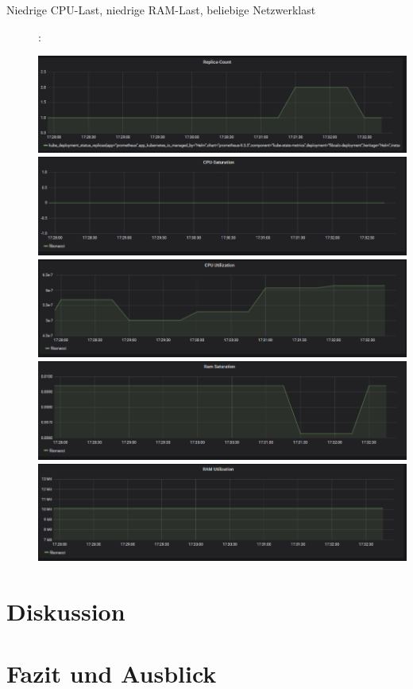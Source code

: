 \documentclass[a4paper,10pt]{scrartcl}
\begin{document}
\begin{description}

\item[Niedrige CPU-Last, niedrige RAM-Last, beliebige Netzwerklast]:\\

\begin{minipage}{\linewidth}
            \includegraphics[width=.5\textwidth]{img/Herunterskalieren/Replica-Count.PNG}
            \includegraphics[scale=1,width=.5\textwidth,height=.14\textheight]{img/Herunterskalieren/CPUSaturation.PNG}
  			\includegraphics[scale=1,width=.5\textwidth]{img/Herunterskalieren/CPUUtilization.PNG}
  			\includegraphics[scale=1,width=.5\textwidth]{img/Herunterskalieren/RAMSaturation.PNG}
  			\includegraphics[scale=1,width=.5\textwidth]{img/Herunterskalieren/RAMUtilization.PNG}
\end{minipage}

\end{description}


\pagebreak

\section{Diskussion}
\section{Fazit und Ausblick}

\newpage

\end{document}
